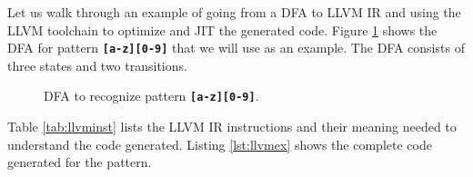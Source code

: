 Let us walk through an example of going from a DFA to LLVM IR and using the LLVM toolchain to optimize and JIT the generated code. Figure \ref{fig:dfacodegenex} shows the DFA for pattern \texttt{\textbf{[a-z][0-9]}} that we will use as an example. The DFA consists of three states and two transitions.

\begin{figure}[H]
\centering
{}
\caption{DFA to recognize pattern \texttt{\textbf{[a-z][0-9]}}.}
\label{fig:dfacodegenex}
\end{figure}

Table \ref{tab:llvminst} lists the LLVM IR instructions and their meaning needed to understand the code generated. Listing \ref{lst:llvmex} shows the complete code generated for the pattern.

